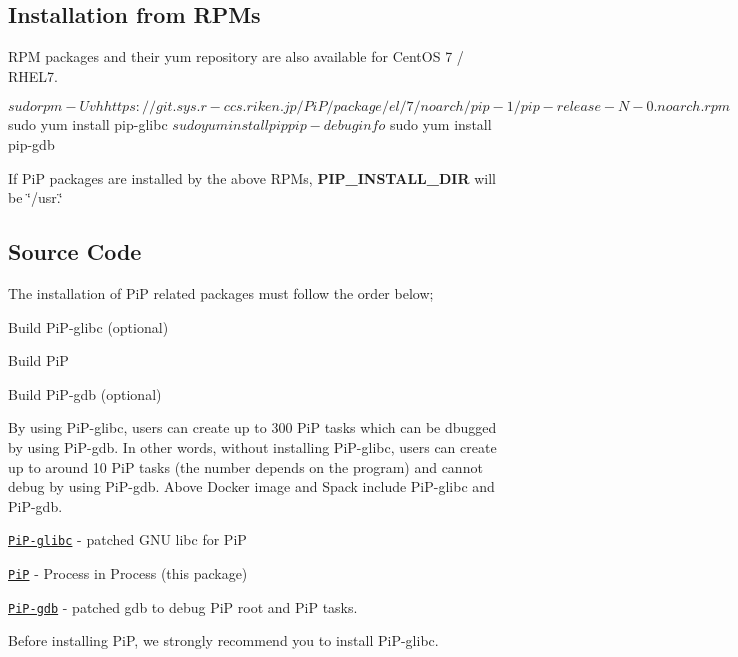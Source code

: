 \subsection*{Installation from R\-P\-Ms}

R\-P\-M packages and their yum repository are also available for Cent\-O\-S 7 / R\-H\-E\-L7. \begin{DoxyVerb}$ sudo rpm -Uvh https://git.sys.r-ccs.riken.jp/PiP/package/el/7/noarch/pip-1/pip-release-N-0.noarch.rpm
$ sudo yum install pip-glibc
$ sudo yum install pip pip-debuginfo
$ sudo yum install pip-gdb
\end{DoxyVerb}


If Pi\-P packages are installed by the above R\-P\-Ms, {\bfseries P\-I\-P\-\_\-\-I\-N\-S\-T\-A\-L\-L\-\_\-\-D\-I\-R} will be \char`\"{}/usr.\char`\"{}

\subsection*{Source Code}

The installation of Pi\-P related packages must follow the order below;


\begin{DoxyEnumerate}
\item Build Pi\-P-\/glibc (optional)
\item Build Pi\-P
\item Build Pi\-P-\/gdb (optional)
\end{DoxyEnumerate}

By using Pi\-P-\/glibc, users can create up to 300 Pi\-P tasks which can be dbugged by using Pi\-P-\/gdb. In other words, without installing Pi\-P-\/glibc, users can create up to around 10 Pi\-P tasks (the number depends on the program) and cannot debug by using Pi\-P-\/gdb. Above Docker image and Spack include Pi\-P-\/glibc and Pi\-P-\/gdb.


\begin{DoxyItemize}
\item \href{https://github.com/RIKEN-SysSoft/PiP-glibc}{\tt Pi\-P-\/glibc} -\/ patched G\-N\-U libc for Pi\-P
\item \href{https://github.com/RIKEN-SysSoft/PiP}{\tt Pi\-P} -\/ Process in Process (this package)
\item \href{https://github.com/RIKEN-SysSoft/PiP-gdb}{\tt Pi\-P-\/gdb} -\/ patched gdb to debug Pi\-P root and Pi\-P tasks.
\end{DoxyItemize}

Before installing Pi\-P, we strongly recommend you to install Pi\-P-\/glibc.

